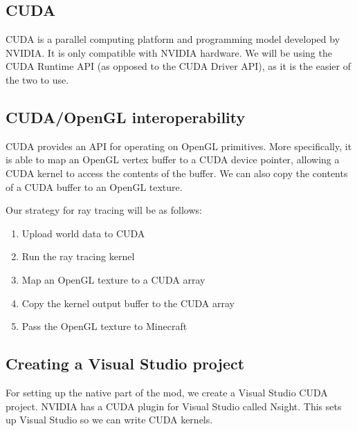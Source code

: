 \documentclass[]{article}
\begin{document}
\subsection{CUDA}
CUDA is a parallel computing platform and programming model developed by NVIDIA.
It is only compatible with NVIDIA hardware.
We will be using the CUDA Runtime API (as opposed to the CUDA Driver API), as it is the easier of the two to use.
\subsection{CUDA/OpenGL interoperability}
CUDA provides an API for operating on OpenGL primitives.
More specifically, it is able to map an OpenGL vertex buffer to a CUDA device pointer, allowing a CUDA kernel to access the contents of the buffer.
We can also copy the contents of a CUDA buffer to an OpenGL texture.

Our strategy for ray tracing will be as follows:
\begin{enumerate}
  \item Upload world data to CUDA
  \item Run the ray tracing kernel
  \item Map an OpenGL texture to a CUDA array
  \item Copy the kernel output buffer to the CUDA array
  \item Pass the OpenGL texture to Minecraft
\end{enumerate}

\subsection{Creating a Visual Studio project}
For setting up the native part of the mod, we create a Visual Studio CUDA project.
NVIDIA has a CUDA plugin for Visual Studio called Nsight.
This sets up Visual Studio so we can write CUDA kernels.
\end{document}
